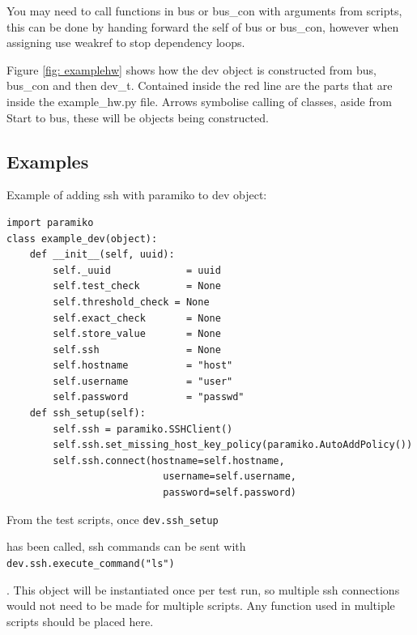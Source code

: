 \documentclass[a4paper,12pt, notitlepage]{article}
\begin{document}
{{{{{{{{{{{You may need to call functions in bus or bus\_con with arguments from scripts, this can be done by handing forward the self of bus or bus\_con, however when assigning use weakref to stop dependency loops.

Figure \ref{fig: examplehw} shows how the dev object is constructed from bus, bus\_con and then dev\_t. Contained inside the red line are the parts that are inside the example\_hw.py file. Arrows symbolise calling of classes, aside from Start to bus, these will be objects being constructed. 

\subsection{Examples}
\label{subsec: examplehwExamples}

Example of adding ssh with paramiko to dev object:
\begin{lstlisting}[caption={A simplified dev object to handle ssh connections},label={lst: examplehwExample0}]
import paramiko
class example_dev(object):
    def __init__(self, uuid):
        self._uuid             = uuid
        self.test_check        = None
        self.threshold_check = None
        self.exact_check       = None
        self.store_value       = None
        self.ssh               = None
        self.hostname          = "host"
        self.username          = "user"
        self.password          = "passwd"
    def ssh_setup(self):
        self.ssh = paramiko.SSHClient()
        self.ssh.set_missing_host_key_policy(paramiko.AutoAddPolicy())
        self.ssh.connect(hostname=self.hostname,
                           username=self.username,
                           password=self.password)
\end{lstlisting}

From the test scripts, once \lstinline{dev.ssh_setup}{ has been called, ssh commands can be sent with \lstinline{dev.ssh.execute_command("ls")}{. This object will be instantiated once per test run, so multiple ssh connections would not need to be made for multiple scripts. Any function used in multiple scripts should be placed here.

}}}}}}}}}}}}}
\end{document}

